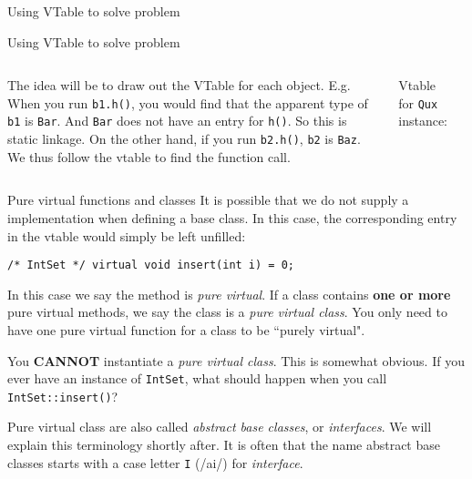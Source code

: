 \begin{frame}[fragile]{Using VTable to solve problem}
\end{frame}

\begin{frame}[fragile]{Using VTable to solve problem}
\begin{columns}
	
	The idea will be to draw out the VTable for each object. E.g. When you run \texttt{b1.h()}, you would find that the apparent type of \texttt{b1} is \texttt{Bar}. And \texttt{Bar} does not have an entry for \texttt{h()}. So this is static linkage. On the other hand, if you run \texttt{b2.h()}, \texttt{b2} is \texttt{Baz}. We thus follow the vtable to find the function call.

	
	
	Vtable for \texttt{Qux} instance:
	\inputminted[fontsize=\small]{c++}{code/rc10virtual/vtable_qux.cpp}
\end{columns}
\end{frame}

\begin{frame}[fragile]{Pure virtual functions and classes}
It is possible that we do not supply a implementation when defining a base class. In this case, the corresponding entry in the vtable would simply be left unfilled:

\begin{verbatim}
/* IntSet */ virtual void insert(int i) = 0;
\end{verbatim}

In this case we say the method is \textit{pure virtual}. If a class contains \textbf{one or more} pure virtual methods, we say the class is a \textit{pure virtual class}. You only need to have one pure virtual function for a class to be ``purely virtual".

You \textbf{CANNOT} instantiate a \textit{pure virtual class}. This is somewhat obvious. If you ever have an instance of \texttt{IntSet}, what should happen when you call \texttt{IntSet::insert()}?

Pure virtual class are also called \textit{abstract base classes}, or \textit{interfaces}. We will explain this terminology shortly after. It is often that the name abstract base classes starts with a case letter \texttt{I} (/ai/) for \textit{interface}.
\end{frame}

